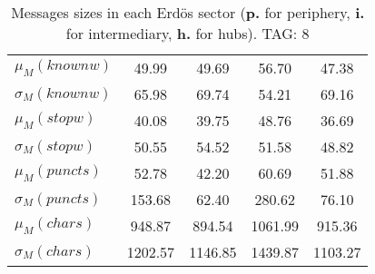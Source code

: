 \begin{table}[h!]
\begin{center}
\begin{tabular}{| l || c | c | c | c |}
$\mu_M(knownw)$ & 49.99  & 49.69  & 56.70  & 47.38 \\
$\sigma_M(knownw)$ & 65.98  & 69.74  & 54.21  & 69.16 \\\hline
$\mu_M(stopw)$ & 40.08  & 39.75  & 48.76  & 36.69 \\
$\sigma_M(stopw)$ & 50.55  & 54.52  & 51.58  & 48.82 \\\hline
$\mu_M(puncts)$ & 52.78  & 42.20  & 60.69  & 51.88 \\
$\sigma_M(puncts)$ & 153.68  & 62.40  & 280.62  & 76.10 \\\hline
$\mu_M(chars)$ & 948.87  & 894.54  & 1061.99  & 915.36 \\
$\sigma_M(chars)$ & 1202.57  & 1146.85  & 1439.87  & 1103.27 \\\hline
\end{tabular}
\caption{Messages sizes in each Erd\"os sector ({{\bf p.}} for periphery, {{\bf i.}} for intermediary, {{\bf h.}} for hubs). TAG: 8}
\end{center}
\end{table}